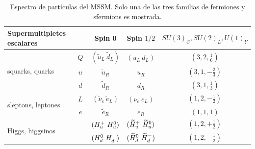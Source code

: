 \begin{table}[!ht] 

	\centering

	\caption{Espectro de partículas del MSSM. Solo una de las tres familias de fermiones y sfermions es mostrada. 
	}
	\renewcommand{\arraystretch}{1.2}
	\begin{tabular}{ l c | c c c}

	\hline
	\hline

		\multicolumn{2}{l|}{Supermultipletes escalares} & Spin 0 & Spin $1/2$ & $SU(3)_C, SU(2)_L, U(1)_Y$ \\ 

		\hline
		\hline

		\multirow{3}{*}{squarks, quarks} & $Q$ & $(\tilde{u}_L\ \tilde{d}_L)$ & $(u_L\ d_L)$ & $(3, 2, \frac{1}{6})$ \\ [1ex]
		 & $u$ & $\tilde{u}_R$ & $u_R$ & $(3, 1, -\frac{2}{3})$ \\ [1ex]
		 & $d$ & $\tilde{d}_R$ & $d_R$ & $(3, 1, \frac{1}{3})$ \\ [1ex]

		\hline

		\multirow{2}{*}{sleptons, leptones} & $L$ & $(\tilde{\nu}_e\ \tilde{e}_L)$ & $(\nu_e\ e_L)$ & $(1, 2, -\frac{1}{2})$ \\ [1ex]
		 & $e$ & $\tilde{e}_R$ & $e_R$ & $(1, 1, 1)$ \\ [1ex]

		\hline

		\multirow{2}{*}{Higgs, higgsinos} & \Hu & $(\Hup\ \Huzero)$ & $(\Hinoup\ \Hinouzero)$ & $(1, 2, +\frac{1}{2})$ \\ [1ex]
		 & \Hd & $(\Hdzero\ \Hdm)$ & $(\Hinodzero\ \Hinodm)$ & $(1, 2, -\frac{1}{2})$ \\ [1ex]


		\hline
		\hline

	\end{tabular}

	\vspace{0.5cm}


\end{table}
